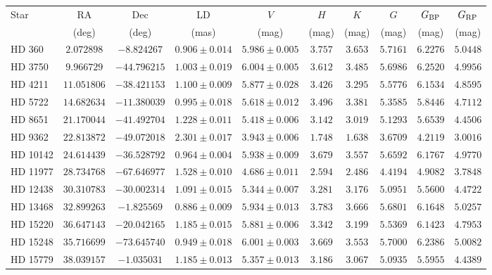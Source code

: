 \documentclass[linenumbers,trackchanges,margins]{aastex701}
\begin{document}
\begin{table}[htbp]
\begin{tabular}{lccccccccc}
\hline
\hline
Star & RA & Dec & LD & $V$ & $H$ & $K$ & $G$ & $G_{\rm BP}$ & $G_{\rm RP}$ \\
 & (deg) & (deg) & (mas) & (mag) & (mag) & (mag) & (mag) & (mag) & (mag) \\
\hline
HD 360 & $2.072898$ & $-8.824267$ & $0.906 \pm 0.014$ & $5.986 \pm 0.005$ & $3.757$ & $3.653$ & $5.7161$ & $6.2276$ & $5.0448$ \\
HD 3750 & $9.966729$ & $-44.796215$ & $1.003 \pm 0.019$ & $6.004 \pm 0.005$ & $3.612$ & $3.485$ & $5.6986$ & $6.2520$ & $4.9956$ \\
HD 4211 & $11.051806$ & $-38.421153$ & $1.100 \pm 0.009$ & $5.877 \pm 0.028$ & $3.426$ & $3.295$ & $5.5776$ & $6.1534$ & $4.8595$ \\
HD 5722 & $14.682634$ & $-11.380039$ & $0.995 \pm 0.018$ & $5.618 \pm 0.012$ & $3.496$ & $3.381$ & $5.3585$ & $5.8446$ & $4.7112$ \\
HD 8651 & $21.170044$ & $-41.492704$ & $1.228 \pm 0.011$ & $5.418 \pm 0.006$ & $3.142$ & $3.019$ & $5.1293$ & $5.6539$ & $4.4506$ \\
HD 9362 & $22.813872$ & $-49.072018$ & $2.301 \pm 0.017$ & $3.943 \pm 0.006$ & $1.748$ & $1.638$ & $3.6709$ & $4.2119$ & $3.0016$ \\
HD 10142 & $24.614439$ & $-36.528792$ & $0.964 \pm 0.004$ & $5.938 \pm 0.009$ & $3.679$ & $3.557$ & $5.6592$ & $6.1767$ & $4.9770$ \\
HD 11977 & $28.734768$ & $-67.646977$ & $1.528 \pm 0.010$ & $4.686 \pm 0.011$ & $2.594$ & $2.486$ & $4.4194$ & $4.9082$ & $3.7848$ \\
HD 12438 & $30.310783$ & $-30.002314$ & $1.091 \pm 0.015$ & $5.344 \pm 0.007$ & $3.281$ & $3.176$ & $5.0951$ & $5.5600$ & $4.4722$ \\
HD 13468 & $32.899263$ & $-1.825569$ & $0.886 \pm 0.009$ & $5.934 \pm 0.013$ & $3.783$ & $3.666$ & $5.6801$ & $6.1648$ & $5.0257$ \\
HD 15220 & $36.647143$ & $-20.042165$ & $1.185 \pm 0.015$ & $5.881 \pm 0.006$ & $3.342$ & $3.199$ & $5.5369$ & $6.1423$ & $4.7953$ \\
HD 15248 & $35.716699$ & $-73.645740$ & $0.949 \pm 0.018$ & $6.001 \pm 0.003$ & $3.669$ & $3.553$ & $5.7000$ & $6.2386$ & $5.0082$ \\
HD 15779 & $38.039157$ & $-1.035031$ & $1.185 \pm 0.013$ & $5.357 \pm 0.013$ & $3.186$ & $3.067$ & $5.0935$ & $5.5955$ & $4.4389$ \\

\end{tabular}
\end{table}
\end{document}
